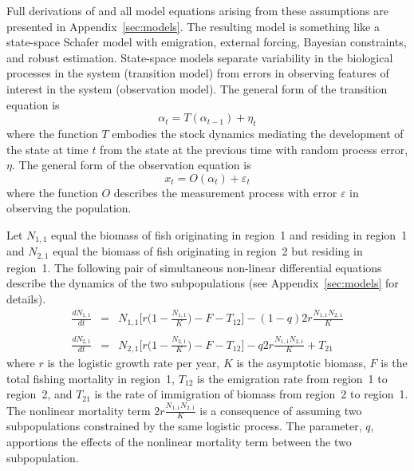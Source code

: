 \documentclass[12pt,letterpaper,twoside]{article}
\newcommand\None{{N_{1,1}}}
\newcommand\Ntwo{{N_{2,1}}}
\begin{document}
Full derivations of and all model equations arising from these
assumptions are presented in Appendix~\ref{sec:models}. The resulting
model is something like a state-space Schafer model with emigration,
external forcing, Bayesian constraints, and robust estimation.
State-space models separate variability in the biological
processes in the system (transition model)
from errors in observing features of interest
in the system (observation model). 
The general form of the transition equation is
\begin{equation}
\alpha_t=T(\alpha_{t-1}) + \eta_t
\end{equation}
where the function $T$ embodies the stock dynamics mediating the
development of the state at time $t$ from the state at the previous
time with random process error, $\eta$.
The general form of the observation equation is
\begin{equation}
x_t = O(\alpha_t) + \varepsilon_t
\end{equation}
where the function $O$ describes the measurement process with
error $\varepsilon$ in observing the population.

Let $\None$ equal the biomass of fish originating in region~1
and residing in region~1
and $\Ntwo$ equal the biomass of fish originating in region~2
but residing in region~1.
The following pair of simultaneous non-linear differential equations
describe the dynamics of the two subpopulations (see
Appendix~\ref{sec:models} for details).
\begin{eqnarray}
\label{eqn:coupledschaeferq}
\frac{d\None}{dt}&=&\None\Big[r\Big(1-\frac{\None}{K}\Big)
-F - T_{12}\Big] - (1-q)2r\frac{\None\Ntwo}{K}\nonumber\\
\\
\frac{d\Ntwo}{dt}&=&\Ntwo\Big[r\Big(1-\frac{\Ntwo}{K}\Big)
-F - T_{12}\Big] - q2r\frac{\None\Ntwo}{K} + T_{21}\nonumber
\end{eqnarray}
where $r$ is the logistic growth rate per year,
$K$ is the asymptotic biomass,
$F$ is the total fishing mortality in region~1, $T_{12}$
is the emigration rate from region~1 to region~2, and $T_{21}$
is the rate of immigration of biomass from region~2 to region~1.
The nonlinear mortality term $2r\frac{\None\Ntwo}{K}$ is a
consequence of assuming
two subpopulations constrained by the same logistic process.
The parameter, $q$, apportions the effects of the nonlinear
mortality term between the two subpopulation.
\end{document}
